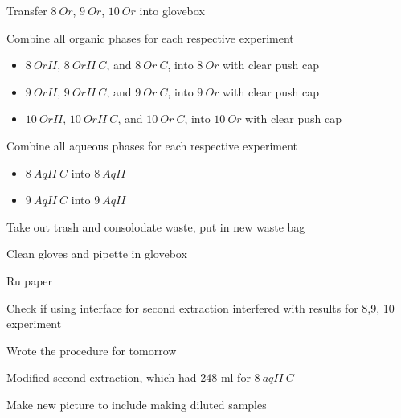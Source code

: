 \documentclass[idxtotoc,hyperref,openany,oneside]{labbook} %
\newcommand{\cmark}{\ding{51}}%
\newcommand{\done}{\rlap{$\square$}{\raisebox{2pt}{\large\hspace{1pt}\cmark}}%
  \hspace{-2.5pt}}
\begin{document}
\begin{todolist}
\item[\done]{Transfer $\boxed{8\ Or}$, $\boxed{9\ Or}$,
    $\boxed{10\ Or}$ into glovebox}
\item[\done]{Combine all organic phases for each respective experiment}
  \begin{itemize}
  \item{$\boxed{8\ OrII}$, $\boxed{8\ OrII\ C}$,
    and $\boxed{8\ Or\ C}$, into $\boxed{8\ Or}$ with clear push
    cap}
  \item{$\boxed{9\ OrII}$, $\boxed{9\ OrII\ C}$,
    and $\boxed{9\ Or\ C}$, into $\boxed{9\ Or}$ with clear push
    cap}
  \item{$\boxed{10\ OrII}$, $\boxed{10\ OrII\ C}$,
    and $\boxed{10\ Or\ C}$, into $\boxed{10\ Or}$ with clear push
    cap}
  \end{itemize}
\item[\done]{Combine all aqueous phases for each respective experiment}
  \begin{itemize}
  \item{$\boxed{8\ AqII\ C}$ into $\boxed{8\ AqII}$}
    \item{$\boxed{9\ AqII\ C}$ into $\boxed{9\ AqII}$}
  \end{itemize}
\item[\done]{Take out trash and consolodate waste, put in new waste
  bag}
\item[\done]{Clean gloves and pipette in glovebox}
\end{todolist}


\begin{todolist}
\item{Ru paper}
\item{Check if using interface for second extraction
  interfered with results for 8,9, 10 experiment}
\item[\done]{Wrote the procedure for tomorrow}
\item[\done]{Modified second extraction,
  which had 248 ml for $\boxed{8\ aqII\ C}$}
\item[\done]{Make new picture to include making diluted samples}
\end{todolist}



\end{document}
